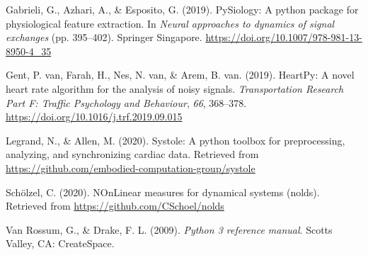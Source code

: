 \documentclass[
  english,
  man,floatsintext]{apa6}
\begin{document}
\leavevmode\hypertarget{ref-PySiology}{}%
Gabrieli, G., Azhari, A., \& Esposito, G. (2019). PySiology: A python package for physiological feature extraction. In \emph{Neural approaches to dynamics of signal exchanges} (pp. 395--402). Springer Singapore. \url{https://doi.org/10.1007/978-981-13-8950-4_35}

\leavevmode\hypertarget{ref-HeartPy}{}%
Gent, P. van, Farah, H., Nes, N. van, \& Arem, B. van. (2019). HeartPy: A novel heart rate algorithm for the analysis of noisy signals. \emph{Transportation Research Part F: Traffic Psychology and Behaviour}, \emph{66}, 368--378. \url{https://doi.org/10.1016/j.trf.2019.09.015}

\leavevmode\hypertarget{ref-Systole}{}%
Legrand, N., \& Allen, M. (2020). Systole: A python toolbox for preprocessing, analyzing, and synchronizing cardiac data. Retrieved from \url{https://github.com/embodied-computation-group/systole}

\leavevmode\hypertarget{ref-nolds}{}%
Schölzel, C. (2020). NOnLinear measures for dynamical systems (nolds). Retrieved from \url{https://github.com/CSchoel/nolds}

\leavevmode\hypertarget{ref-python3}{}%
Van Rossum, G., \& Drake, F. L. (2009). \emph{Python 3 reference manual}. Scotts Valley, CA: CreateSpace.

\endgroup
\end{document}
